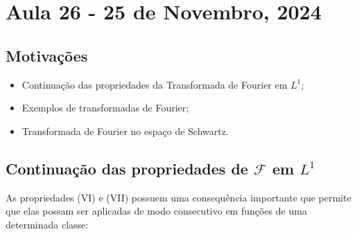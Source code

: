 \documentclass[../distribution_theory_notes.tex]{subfiles}
\begin{document}
\section{Aula 26 - 25 de Novembro, 2024}
\subsection{Motivações}
\begin{itemize}
	\item Continuação das propriedades da Transformada de Fourier em \(L^{1}\);
	\item Exemplos de transformadas de Fourier;
	\item Transformada de Fourier no espaço de Schwartz.
\end{itemize}

\subsection{Continuação das propriedades de \(\mathcal{F}\) em \(L^{1}\)}
As propriedades (VI) e (VII) possuem uma consequência importante que permite que elas possam ser aplicadas de modo consecutivo em funções de uma determinada classe:
\end{document}
